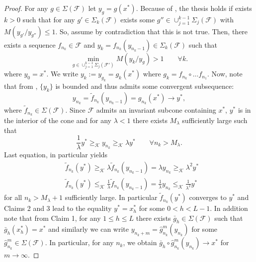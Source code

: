 \documentclass{article}
\newcommand{\family}{\mathcal{F}}
\newcommand{\cone}{\mathcal{K}}
\newcommand{\cgeq}{\geq_{\cone}}
\newcommand{\cleq}{\leq_{\cone}}
\begin{document}
\begin{proof}
   For any $g\in \Sigma(\family)$ let $y_g=g(x^*)$. 
    Because of , the thesis holds if exists $k>0$ such that for any $g'\in \Sigma_k(\family)$ exists some $g''\in \cup_{j=1}^{k-1}\Sigma_j(\family)$ with  $M(y_{g'}/y_{g''})\leq 1$.
     So, assume by contradiction that this is not true. Then, there exists a sequence $f_{n_k}\in \family$ and $y_k=f_{n_k}(y_{n_k-1}) \in \Sigma_{k}(\family)$ such that 
     \begin{equation}\label{eq:1_extremal_polytope}
         \min_{g\in \cup_{j=1}^{k-1}\Sigma_j(\family')} M(y_{k}/ y_g)>1 \qquad \forall k.
     \end{equation} 
     where $y_0=x^*$. We write $y_k:=y_{g_k}=g_k(x^*)$ where $g_k=f_{n_k}\circ \dots f_{n_1}$.
   Now, note that from , $\{y_k\}$ is bounded and thus admits some convergent subsequence:
   \begin{equation}
       y_{n_k}=\tilde{f}_{n_k}(y_{n_k-1})=g_{n_k}(x^*)\longrightarrow y^*,
   \end{equation}
   where $\tilde{f}_{n_k}\in \Sigma(\family)$.
%
Since $\family$ admits an invariant subcone containing $x^*$, $y^*$ is in the interior of the cone and for any $\lambda<1$ there exists $M_{\lambda}$ sufficiently large such that 
%
\begin{equation}
    \frac{1}{\lambda}y^*\cgeq y_{n_{k}}\cgeq \lambda y^*  \qquad \forall n_k> M_{\lambda}.
\end{equation}
%
Last equation, in particular yields 
\begin{equation}
\begin{aligned}
     & \tilde{f}_{n_k}(y^*)\cgeq \lambda \tilde{f}_{n_k}(y_{n_k-1}) = \lambda y_{n_k} \cgeq \lambda^2 y^* \\
    & \tilde{f}_{n_k}(y^*)\cleq \frac{1}{\lambda} \tilde{f}_{n_k}(y_{n_k-1}) = \frac{1}{\lambda} y_{n_k} \cleq \frac{1}{\lambda^2} y^* 
\end{aligned}
\end{equation}
%
for all $n_k>M_\lambda+1$ sufficiently large.
%
   In particular $\tilde{f}_{n_k}(y^*)$ converges to $y^*$ and Claims 2 and 3 lead to the equality $y^*=x_{h}^*$ for some $0<h<L-1$.
%
%
In addition note that from Claim 1, for any $1\leq h\leq L$ there exists $\bar{g}_h\in \Sigma(\family)$ such that $\bar{g}_h(x_h^*)=x^*$ and similarly we can write $y_{n_k+m}=\hat{g}_{n_k}^m(y_{n_k})$ for some $\hat{g}_{n_k}^m\in \Sigma(\family)$.  In particular,  for any $n_k$, we obtain $\bar{g}_h\circ\hat{g}_{n_k}^m(y_{n_k})\rightarrow x^*$ for $m\rightarrow \infty$. 

\end{proof}
\end{document}
